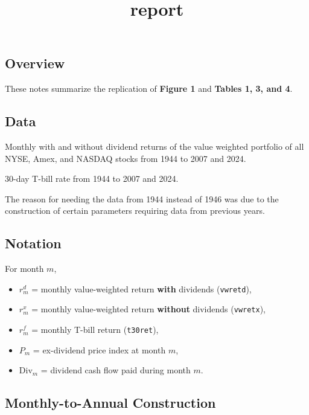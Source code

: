 \documentclass[11pt]{article}
\title{report}
\providecommand{\tightlist}{%
      \setlength{\itemsep}{0pt}\setlength{\parskip}{0pt}}
\begin{document}
    
    \maketitle
    
    

    
    \subsection{Overview}\label{overview}

These notes summarize the replication of \textbf{Figure 1} and
\textbf{Tables 1, 3, and 4}.

    \subsection{Data}\label{data}

Monthly with and without dividend returns of the value weighted
portfolio of all NYSE, Amex, and NASDAQ stocks from 1944 to 2007 and
2024.

30-day T-bill rate from 1944 to 2007 and 2024.

The reason for needing the data from 1944 instead of 1946 was due to the
construction of certain parameters requiring data from previous years.

    \subsection{Notation}\label{notation}

For month \(m\),

\begin{itemize}
\tightlist
\item
  \(r_m^d\) = monthly value-weighted return \textbf{with} dividends
  (\texttt{vwretd}),
\item
  \(r_m^x\) = monthly value-weighted return \textbf{without} dividends
  (\texttt{vwretx}),
\item
  \(r_m^f\) = monthly T-bill return (\texttt{t30ret}),
\item
  \(P_m\) = ex-dividend price index at month \(m\),
\item
  \(\mathrm{Div}_m\) = dividend cash flow paid during month \(m\).
\end{itemize}

    \subsection{Monthly-to-Annual
Construction}\label{monthly-to-annual-construction}
\end{document}
